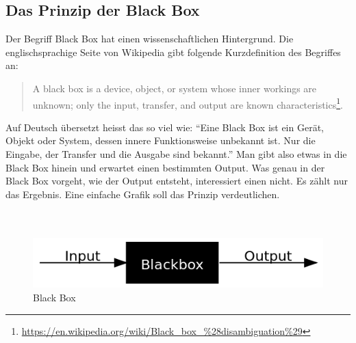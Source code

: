 \subsection{Das Prinzip der Black Box}
Der Begriff Black Box hat einen wissenschaftlichen Hintergrund. Die englischsprachige Seite von Wikipedia gibt folgende Kurzdefinition des Begriffes an:

\begin{quote}
A black box is a device, object, or system whose inner workings are unknown; only the input, transfer, and output are known characteristics\footnote{\url{https://en.wikipedia.org/wiki/Black_box_\%28disambiguation\%29}}.
\end{quote}

Auf Deutsch übersetzt heisst das so viel wie: ``Eine Black Box ist ein Gerät, Objekt oder System, dessen innere Funktionsweise unbekannt ist. Nur die Eingabe, der Transfer und die Ausgabe sind bekannt.''
Man gibt also etwas in die Black Box hinein und erwartet einen bestimmten Output. Was genau in der Black Box vorgeht, wie der Output entsteht, interessiert einen nicht. Es zählt nur das Ergebnis. Eine einfache Grafik soll das Prinzip verdeutlichen. 
\\
\\
\\

\begin{figure}[h]
\centering
\includegraphics[scale=0.75]{images/BlackBox}
\caption{Black Box}
\end{figure}

